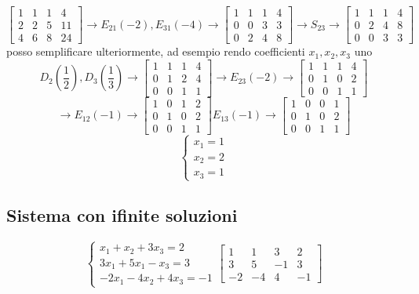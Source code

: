\[
	\begin{bmatrix}
		1 & 1 & 1 & 4  \\
		2 & 2 & 5 & 11 \\
		4 & 6 & 8 & 24
	\end{bmatrix}
	\rightarrow
	E_{21}\left( -2 \right) , E_{31}\left( -4 \right)
	\rightarrow
	\begin{bmatrix}
		1 & 1 & 1 & 4 \\
		0 & 0 & 3 & 3 \\
		0 & 2 & 4 & 8
	\end{bmatrix}
	\rightarrow
	S_{23}
	\rightarrow
	\begin{bmatrix}
		1 & 1 & 1 & 4 \\
		0 & 2 & 4 & 8 \\
		0 & 0 & 3 & 3
	\end{bmatrix}
\]
posso semplificare ulteriormente, ad esempio rendo coefficienti $x_1, x_2, x_3$ uno
\[
	D_2\left( \frac{1}{2} \right) , D_3\left( \frac{1}{3} \right) \rightarrow
	\begin{bmatrix}
		1 & 1 & 1 & 4 \\
		0 & 1 & 2 & 4 \\
		0 & 0 & 1 & 1
	\end{bmatrix}
	\rightarrow
	E_{23}\left( -2 \right) \rightarrow
	\begin{bmatrix}
		1 & 1 & 1 & 4 \\
		0 & 1 & 0 & 2 \\
		0 & 0 & 1 & 1
	\end{bmatrix}
\]
\[
	\rightarrow
	E_{12}\left( -1 \right) \rightarrow
	\begin{bmatrix}
		1 & 0 & 1 & 2 \\
		0 & 1 & 0 & 2 \\
		0 & 0 & 1 & 1
	\end{bmatrix}
	E_{13}\left( -1 \right) \rightarrow
	\begin{bmatrix}
		1 & 0 & 0 & 1 \\
		0 & 1 & 0 & 2 \\
		0 & 0 & 1 & 1
	\end{bmatrix}
\]
\[
	\begin{cases}
		x_1=1 \\
		x_2=2 \\
		x_3=1
	\end{cases}
\]
\subsection{Sistema con ifinite soluzioni}
\[
	\begin{cases}
		x_1 + x_2 + 3x_3 = 2 \\
		3x_1 + 5x_1 -x_3 = 3 \\
		-2x_1 -4x_2 + 4x_3 = -1
	\end{cases}
	\begin{bmatrix}
		1  & 1  & 3  & 2  \\
		3  & 5  & -1 & 3  \\
		-2 & -4 & 4  & -1
	\end{bmatrix}
\]

